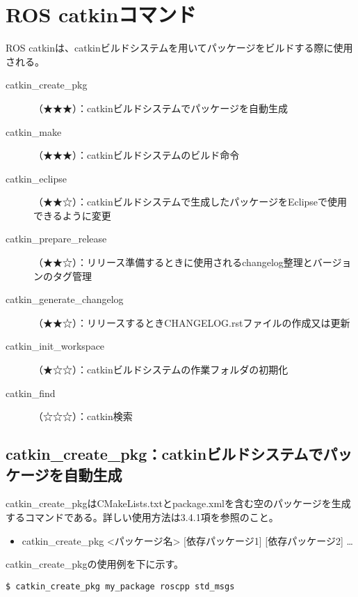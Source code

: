 \section{ROS catkinコマンド}

ROS catkinは、catkinビルドシステムを用いてパッケージをビルドする際に使用される。

\vspace{\baselineskip}
\noindent
\begin{description}
\item[catkin\_create\_pkg]（★★★）：catkinビルドシステムでパッケージを自動生成
\item[catkin\_make]（★★★）：catkinビルドシステムのビルド命令
\item[catkin\_eclipse]（★★☆）：catkinビルドシステムで生成したパッケージをEclipseで使用できるように変更
\item[catkin\_prepare\_release]（★★☆）：リリース準備するときに使用されるchangelog整理とバージョンのタグ管理
\item[catkin\_generate\_changelog]（★★☆）：リリースするときCHANGELOG.rstファイルの作成又は更新
\item[catkin\_init\_workspace]（★☆☆）：catkinビルドシステムの作業フォルダの初期化
\item[catkin\_find]（☆☆☆）：catkin検索
\end{description}

\subsection{catkin\_create\_pkg：catkinビルドシステムでパッケージを自動生成}

catkin\_create\_pkgはCMakeLists.txtとpackage.xmlを含む空のパッケージを生成するコマンドである。詳しい使用方法は3.4.1項を参照のこと。

\vspace{\baselineskip}
\begin{itemize}
\item catkin\_create\_pkg <パッケージ名> [依存パッケージ1] [依存パッケージ2] …
\end{itemize}
\vspace{\baselineskip}

catkin\_create\_pkgの使用例を下に示す。

\begin{lstlisting}[language=ROS]
$ catkin_create_pkg my_package roscpp std_msgs
\end{lstlisting}

